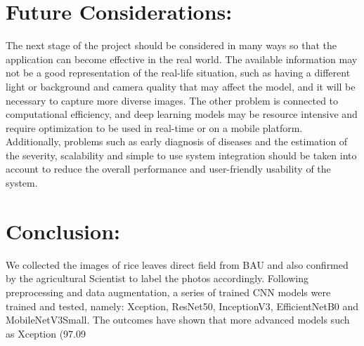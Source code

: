 \documentclass[11pt,a4paper]{article}
\begin{document}
\section{Future Considerations:}
The next stage of the project should be considered in many ways so that the application can become effective in the real world. The available information may not be a good representation of the real-life situation, such as having a different light or background and camera quality that may affect the model, and it will be necessary to capture more diverse images. The other problem is connected to computational efficiency, and deep learning models may be resource intensive and require optimization to be used in real-time or on a mobile platform. Additionally, problems such as early diagnosis of diseases and the estimation of the severity, scalability and simple to use system integration should be taken into account to reduce the overall performance and user-friendly usability of the system.

\section{Conclusion:}
We collected the images of rice leaves direct field from BAU and also confirmed by the agricultural Scientist to label the photos accordingly. Following preprocessing and data augmentation, a series of trained CNN models were trained and tested, namely: Xception, ResNet50, InceptionV3, EfficientNetB0 and MobileNetV3Small. The outcomes have shown that more advanced models such as Xception (97.09%

\end{document}
